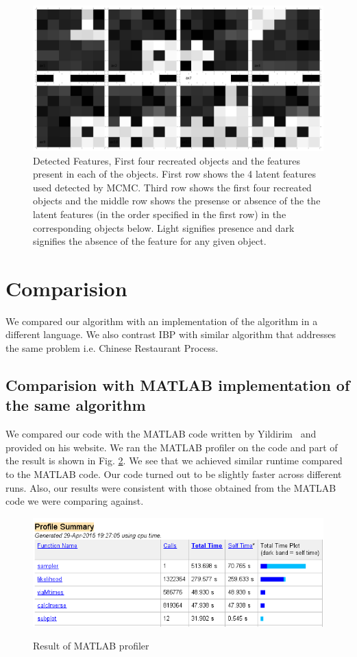 \documentclass{article}
\begin{document}
\begin{figure}[ht]
\includegraphics[width=\linewidth]{figures/Detected.png}
\caption {Detected Features, First four recreated objects and the features present in each of the objects. First row shows the 4 latent features used detected by MCMC. Third row shows the first four recreated objects and the middle row shows the presense or absence of the the latent features (in the order specified in the first row) in the corresponding objects below. Light signifies presence and dark signifies the absence of the feature for any given object.}
\label{fig:detected}
\end{figure}

\section{Comparision}
We compared our algorithm with an implementation of the algorithm in a different language. We also contrast IBP with similar algorithm that addresses the same problem i.e. Chinese Restaurant Process.
\subsection{Comparision with MATLAB implementation of the same algorithm}
We compared our code with the MATLAB code written by Yildirim~\cite{yildirimweb} and provided on his website. We ran the MATLAB profiler on the code and part of the result is shown in Fig. \ref{fig:profilematlab}. We see that we achieved similar runtime compared to the MATLAB code. Our code turned out to be slightly faster across different runs. Also, our results were consistent with those obtained from the MATLAB code we were comparing against.
\begin{figure}[ht]
\caption{Result of MATLAB profiler}
\includegraphics[width=\linewidth]{MatlabProfile.PNG}
\label{fig:profilematlab}
\end{figure}
\end{document}
